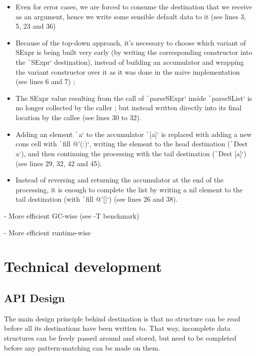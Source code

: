 \documentclass[english]{jflart}
\begin{document}
\begin{itemize}
  \item Even for error cases, we are forced to consume the destination that we receive as an argument, hence we write some sensible default data to it (see lines 3, 5, 23 and 36)
  \item Because of the top-down approach, it's necessary to choose which variant of SExpr is being built very early (by writing the corresponding constructor into the \texttt`SExpr` destination), instead of building an accumulator and wrapping the variant constructor over it as it was done in the naive implementation (see lines 6 and 7) ;
  \item The SExpr value resulting from the call of \texttt`parseSExpr` inside \texttt`parseSList` is no longer collected by the caller ; but instead written directly into its final location by the callee (see lines 30 to 32).
  \item Adding an element \texttt`a` to the accumulator \texttt`[a]` is replaced with adding a new cons cell with \texttt`fill @'(:)`, writing the element to the head destination (\texttt`Dest a`), and then continuing the processing with the tail destination (\texttt`Dest [a]`) (see lines 29, 32, 42 and 45).
  \item Instead of reversing and returning the accumulator at the end of the processing, it is enough to complete the list by writing a nil element to the tail destination (with \texttt`fill @'[]`) (see lines 26 and 38).
\end{itemize}

- More efficient GC-wise (see -T benchmark)

- More efficient runtime-wise

\section{Technical development}

\subsection{API Design}

The main design principle behind destination is that no structure can be read before all its destinations have been written to. That way, incomplete data structures can be freely passed around and stored, but need to be completed before any pattern-matching can be made on them.
\end{document}
